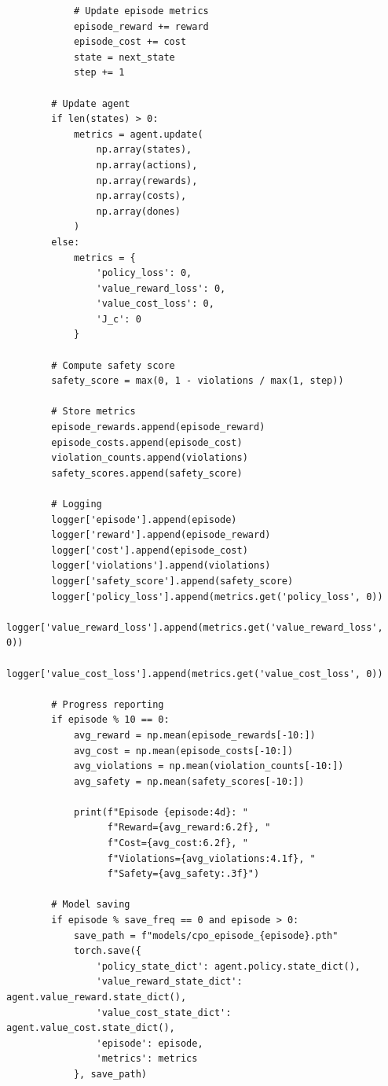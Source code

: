\documentclass[12pt]{article}
\begin{document}
{{{{\begin{verbatim}
            # Update episode metrics
            episode_reward += reward
            episode_cost += cost
            state = next_state
            step += 1
        
        # Update agent
        if len(states) > 0:
            metrics = agent.update(
                np.array(states),
                np.array(actions),
                np.array(rewards),
                np.array(costs),
                np.array(dones)
            )
        else:
            metrics = {
                'policy_loss': 0,
                'value_reward_loss': 0,
                'value_cost_loss': 0,
                'J_c': 0
            }
        
        # Compute safety score
        safety_score = max(0, 1 - violations / max(1, step))
        
        # Store metrics
        episode_rewards.append(episode_reward)
        episode_costs.append(episode_cost)
        violation_counts.append(violations)
        safety_scores.append(safety_score)
        
        # Logging
        logger['episode'].append(episode)
        logger['reward'].append(episode_reward)
        logger['cost'].append(episode_cost)
        logger['violations'].append(violations)
        logger['safety_score'].append(safety_score)
        logger['policy_loss'].append(metrics.get('policy_loss', 0))
        logger['value_reward_loss'].append(metrics.get('value_reward_loss', 0))
        logger['value_cost_loss'].append(metrics.get('value_cost_loss', 0))
        
        # Progress reporting
        if episode % 10 == 0:
            avg_reward = np.mean(episode_rewards[-10:])
            avg_cost = np.mean(episode_costs[-10:])
            avg_violations = np.mean(violation_counts[-10:])
            avg_safety = np.mean(safety_scores[-10:])
            
            print(f"Episode {episode:4d}: "
                  f"Reward={avg_reward:6.2f}, "
                  f"Cost={avg_cost:6.2f}, "
                  f"Violations={avg_violations:4.1f}, "
                  f"Safety={avg_safety:.3f}")
        
        # Model saving
        if episode % save_freq == 0 and episode > 0:
            save_path = f"models/cpo_episode_{episode}.pth"
            torch.save({
                'policy_state_dict': agent.policy.state_dict(),
                'value_reward_state_dict': agent.value_reward.state_dict(),
                'value_cost_state_dict': agent.value_cost.state_dict(),
                'episode': episode,
                'metrics': metrics
            }, save_path)
    

\end{verbatim}}}}}
\end{document}
